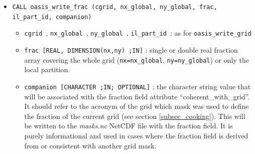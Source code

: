 \begin{itemize}
  \begin{itemize}
  \item {\tt cgrid }, {\tt nx\_global }, {\tt ny\_global }, {\tt il\_part\_id }: as for {\tt oasis\_write\_grid}
  \item {\tt mask [INTEGER, DIMENSION(nx,ny) ;IN]} : mask array
    covering the whole grid ({\tt nx=nx\_global}, {\tt ny=ny\_global})
    or only the local partition. Be careful about OASIS3-MCT
    historical convention (!): 0 = not masked (i.e. active), 1 =
    masked (i.e. not active).
  \item {\tt companion [CHARACTER ;IN; OPTIONAL]} : the character
    string value that will be associated with the mask field attribute {\tt coherent\_with\_grid}'.  This will be written to the {\em masks.nc} netcdf file with the mask field.  It is purely informational and used in cases where the mask field is derived from or consistent with another grid.
  \end{itemize}
  Writes the component grid mask.  The mask field should be consistent
  with the static fraction field (see below) and will define the 0/1 mask of the
  grid cell.  The mask field is used by both the {\tt SCRIPR} remappings and in the global {\tt CONSERV} operations if defined.
  The mask field is written to the {\em masks.nc} file.

  \vspace{0.2cm}
\item {\tt CALL oasis\_write\_frac (cgrid, nx\_global, ny\_global, frac, il\_part\_id, companion)}

  \begin{itemize}
  \item {\tt cgrid }, {\tt nx\_global }, {\tt ny\_global }, {\tt il\_part\_id }: as for {\tt oasis\_write\_grid}
  \item {\tt frac [REAL, DIMENSION(nx,ny) ;IN]} : single or double real fraction array covering the whole grid ({\tt nx=nx\_global}, {\tt ny=ny\_global}) or only the local partition.
  \item {\tt companion [CHARACTER ;IN; OPTIONAL]} : the character
    string value that will be associated with the fraction field attribute
    ``coherent\_with\_grid''.  It should refer to the acronym of
    the grid which mask was used to define the fraction of the current
    grid (see section \ref{subsec_cooking}). This will be written to the {\em
      masks.nc} NetCDF file with the fraction field.  It is purely
    informational and used in cases where the fraction field is derived
    from or consistent with another grid mask.


\end{itemize}
\end{itemize}
